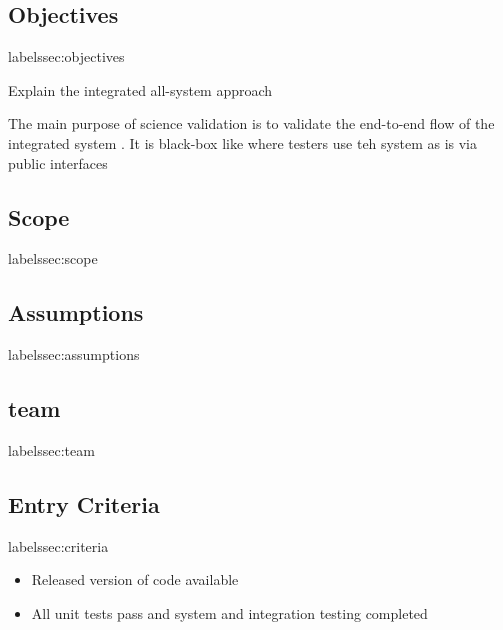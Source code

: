 \subsection{Objectives}   label{ssec:objectives} 

Explain the integrated all-system approach 

The main purpose of science validation is to validate the end-to-end flow of the integrated system . It is black-box like where testers use teh system as is via public interfaces 

\subsection{Scope}   label{ssec:scope}

\subsection{Assumptions}   label{ssec:assumptions }


\subsection{team}   label{ssec:team}


\subsection{Entry Criteria}   label{ssec:criteria}

\begin{itemize}
\item Released version of code available 
\item All unit tests pass and system and integration testing completed
\end{itemize}

